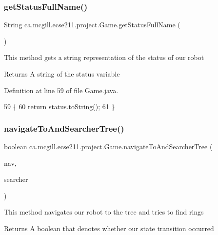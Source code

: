 \subsubsection{\texorpdfstring{get\+Status\+Full\+Name()}{getStatusFullName()}}
{\footnotesize\ttfamily String ca.\+mcgill.\+ecse211.\+project.\+Game.\+get\+Status\+Full\+Name (\begin{DoxyParamCaption}{ }\end{DoxyParamCaption})}

This method gets a string representation of the status of our robot

\begin{DoxyReturn}{Returns}
A string of the status variable 
\end{DoxyReturn}


Definition at line 59 of file Game.\+java.


\begin{DoxyCode}
59                                     \{
60     \textcolor{keywordflow}{return} status.toString();
61   \}
\end{DoxyCode}
\mbox{\label{enumca_1_1mcgill_1_1ecse211_1_1project_1_1_game_a623ef585f41a45d778590392314ea352}} 
\subsubsection{\texorpdfstring{navigate\+To\+And\+Searcher\+Tree()}{navigateToAndSearcherTree()}}
{\footnotesize\ttfamily boolean ca.\+mcgill.\+ecse211.\+project.\+Game.\+navigate\+To\+And\+Searcher\+Tree (\begin{DoxyParamCaption}\item[{\hyperlink{classca_1_1mcgill_1_1ecse211_1_1project_1_1_navigation}{Navigation}}]{nav,  }\item[{\hyperlink{classca_1_1mcgill_1_1ecse211_1_1threads_1_1_ring_searcher}{Ring\+Searcher}}]{searcher }\end{DoxyParamCaption})}

This method navigates our robot to the tree and tries to find rings

\begin{DoxyReturn}{Returns}
A boolean that denotes whether our state transition occurred 
\end{DoxyReturn}



